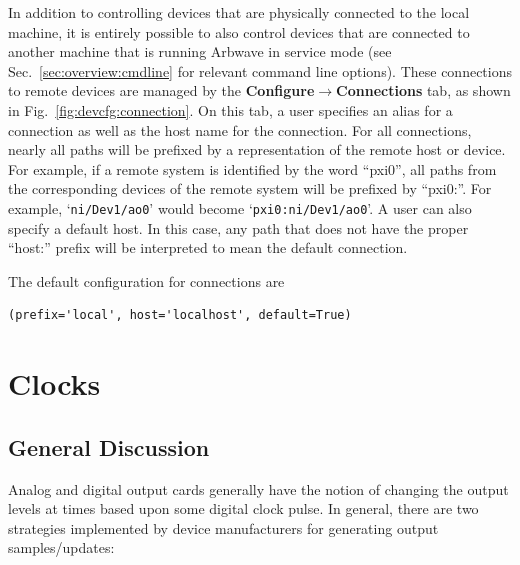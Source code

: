 In addition to controlling devices that are physically connected to the local
machine, it is entirely possible to also control devices that are connected to
another machine that is running Arbwave in service mode (see
Sec.~\ref{sec:overview:cmdline} for relevant command line options).
These connections to remote devices are managed by the
\textbf{Configure$\rightarrow$Connections} tab, as shown in
Fig.~\ref{fig:devcfg:connection}.  On this tab, a user specifies an alias for a
connection as well as the host name for the connection.  For all connections,
nearly all paths will be prefixed by a
representation of the remote host or device.  For example, if a remote system is
identified by the word ``pxi0'', all paths from the corresponding devices of the
remote system will be prefixed by ``pxi0:''.  For example, `\texttt{ni/Dev1/ao0}' would become
`\texttt{pxi0:ni/Dev1/ao0}'.  A user can also specify a default host.  In this case, any
path that does not have the proper ``host:'' prefix will be interpreted to mean
the default connection.

The default configuration for connections are
\begin{lstlisting}
(prefix='local', host='localhost', default=True)
\end{lstlisting}


\section{Clocks}\label{sec:devcfg:clocks}

\subsection{General Discussion}
Analog and digital output cards generally have the notion of changing the output
levels at times based upon some digital clock pulse.  In general, there are two
strategies implemented by device manufacturers for generating output
samples/updates:

